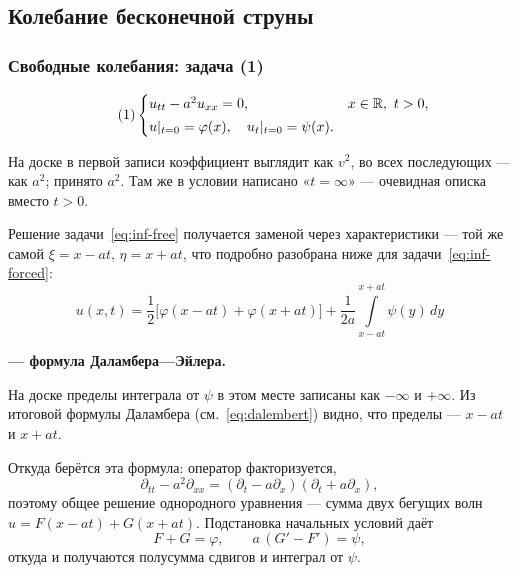 \subsection{Колебание бесконечной струны}

\subsubsection*{Свободные колебания: задача (1)}

\begin{equation}\tag{1}\label{eq:inf-free}
  \begin{cases}
    u_{tt} - a^2 u_{xx} = 0, & x \in \mathbb{R},\ t > 0, \\[2pt]
    u|_{t=0} = \varphi(x), \quad u_t|_{t=0} = \psi(x).
  \end{cases}
\end{equation}

\begin{warn}
На доске в первой записи коэффициент выглядит как $v^2$, во всех последующих —
как $a^2$; принято $a^2$. Там же в условии написано «$t = \infty$» — очевидная
описка вместо $t > 0$.
\end{warn}

Решение задачи~\eqref{eq:inf-free} получается заменой через характеристики —
той же самой $\xi = x - at$, $\eta = x + at$, что подробно разобрана ниже для
задачи~\eqref{eq:inf-forced}:
\[
  u(x,t) = \frac12\Big[\varphi(x-at) + \varphi(x+at)\Big]
         + \frac{1}{2a}\int\limits_{x-at}^{x+at} \psi(y)\, dy
\]
\begin{center}
\textbf{— формула Даламбера—Эйлера.}
\end{center}

\begin{warn}
На доске пределы интеграла от $\psi$ в этом месте записаны как $-\infty$ и
$+\infty$. Из итоговой формулы Даламбера (см.~\eqref{eq:dalembert}) видно, что
пределы — $x-at$ и $x+at$.
\end{warn}

\begin{idea}
Откуда берётся эта формула: оператор факторизуется,
\[
  \partial_{tt} - a^2 \partial_{xx}
  = (\partial_t - a\partial_x)(\partial_t + a\partial_x),
\]
поэтому общее решение однородного уравнения — сумма двух бегущих волн
$u = F(x-at) + G(x+at)$. Подстановка начальных условий даёт
\[
  F + G = \varphi, \qquad a\,(G' - F') = \psi,
\]
откуда и получаются полусумма сдвигов и интеграл от $\psi$.
\end{idea}

